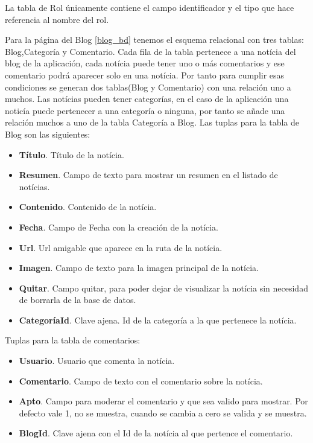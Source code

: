 \vspace{5 mm}

La tabla de Rol únicamente contiene el campo identificador y el tipo que hace referencia al nombre del rol.

\vspace{5 mm}

Para la página del Blog \ref{blog_bd} tenemos el esquema relacional con tres tablas: Blog,Categoría y Comentario. Cada fila de la tabla pertenece a una notícia del blog de la aplicación, cada notícia puede tener uno o más comentarios y ese comentario podrá aparecer solo en una notícia. Por tanto para cumplir esas condiciones se generan dos tablas(Blog y Comentario) con una relación uno a muchos. Las notícias pueden tener categorías, en el caso de la aplicación una noticía puede pertenecer a una categoría o ninguna, por tanto se añade una relación muchos a uno de la tabla Categoría a Blog. Las tuplas para la tabla de Blog son las siguientes:


\begin{itemize}

\item \textbf{Título}. Título de la notícia.
\item \textbf{Resumen}. Campo de texto para mostrar un resumen en el listado de notícias.
\item \textbf{Contenido}. Contenido de la notícia.
\item \textbf{Fecha}. Campo de Fecha con la creación de la notícia.
\item \textbf{Url}. Url amigable que aparece en la ruta de la notícia.
\item \textbf{Imagen}. Campo de texto para la imagen principal de la notícia.
\item \textbf{Quitar}. Campo quitar, para poder dejar de visualizar la notícia sin necesidad de borrarla de la base de datos.
\item \textbf{CategoríaId}. Clave ajena. Id de la categoría a la que pertenece la notícia.

\end{itemize}

\vspace{5 mm}

Tuplas para la tabla de comentarios:

\begin{itemize}

\item \textbf{Usuario}. Usuario que comenta la notícia.
\item \textbf{Comentario}. Campo de texto con el comentario sobre la notícia.
\item \textbf{Apto}. Campo para moderar el comentario y que sea valido para mostrar. Por defecto vale 1, no se muestra, cuando se cambia a cero se valida y se muestra.
\item \textbf{BlogId}. Clave ajena con el Id de la notícia al que pertence el comentario.


\end{itemize}

